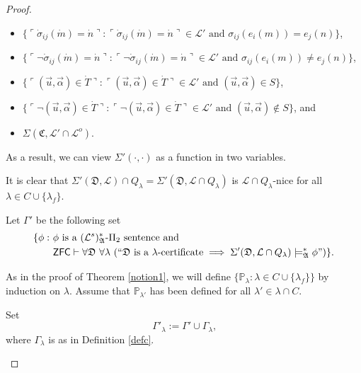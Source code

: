 \documentclass[12pt]{article}
\numberwithin{equation}{section}
\begin{document}
\begin{proof}
\begin{defi}
\begin{itemize}
    \item $\{\ulcorner \dot{\sigma}_{ij}(\dot{m}) = \dot{n} \urcorner : \ulcorner \dot{\sigma}_{ij}(\dot{m}) = \dot{n} \urcorner \in \mathcal{L}' \text{ and } \sigma_{ij}(e_i(m)) = e_j(n)\}$,
    \item $\{\ulcorner \neg \dot{\sigma}_{ij}(\dot{m}) = \dot{n} \urcorner : \ulcorner \neg \dot{\sigma}_{ij}(\dot{m}) = \dot{n} \urcorner \in \mathcal{L}' \text{ and } \sigma_{ij}(e_i(m)) \neq e_j(n)\}$,
    \item $\{\ulcorner (\Vec{u}, \Vec{\alpha}) \in \dot{T} \urcorner : \ulcorner (\Vec{u}, \Vec{\alpha}) \in \dot{T} \urcorner \in \mathcal{L}' \text{ and } (\Vec{u}, \Vec{\alpha}) \in S\}$,
    \item $\{\ulcorner \neg (\Vec{u}, \Vec{\alpha}) \in \dot{T} \urcorner : \ulcorner \neg (\Vec{u}, \Vec{\alpha}) \in \dot{T} \urcorner \in \mathcal{L}' \text{ and } (\Vec{u}, \Vec{\alpha}) \not\in S\}$, and
    \item $\Sigma(\mathfrak{C}, \mathcal{L}' \cap \mathcal{L}^o)$.
\end{itemize}
As a result, we can view $\Sigma'(\cdot, \cdot)$ as a function in two variables.
\end{defi}

It is clear that $\Sigma'(\mathfrak{D}, \mathcal{L}) \cap Q_{\lambda} = \Sigma'(\mathfrak{D}, \mathcal{L} \cap Q_{\lambda})$ is $\mathcal{L} \cap Q_{\lambda}$-nice for all $\lambda \in C \cup \{\lambda_f\}$.

\begin{defi}
Let $\Gamma'$ be the following set
\begin{align*}
    \{\phi : \ & \phi \text{ is a } (\mathcal{L}^s)^*_{\mathfrak{A}}\text{-}\Pi_2 \text{ sentence and} \\
    & \mathsf{ZFC} \vdash \forall \mathfrak{D} \ \forall \lambda \ (``\mathfrak{D} \text{ is a } \lambda \text{-certificate} \implies \Sigma'(\mathfrak{D}, \mathcal{L} \cap Q_{\lambda}) \models^*_{\mathfrak{A}} \phi")\} \text{.}
\end{align*}
\end{defi}

As in the proof of Theorem \ref{notion1}, we will define $\{\mathbb{P}_{\lambda} : \lambda \in C \cup \{\lambda_f\}\}$ by induction on $\lambda$. Assume that $\mathbb{P}_{\lambda'}$ has been defined for all $\lambda' \in \lambda \cap C$. 

\begin{defi}\label{def447}
Set
\begin{equation*}
    \Gamma'_{\lambda} := \Gamma' \cup \Gamma_{\lambda} \text{,}
\end{equation*}
where $\Gamma_{\lambda}$ is as in Definition \ref{defc}. 
\end{defi}


\end{proof}
\end{document}
